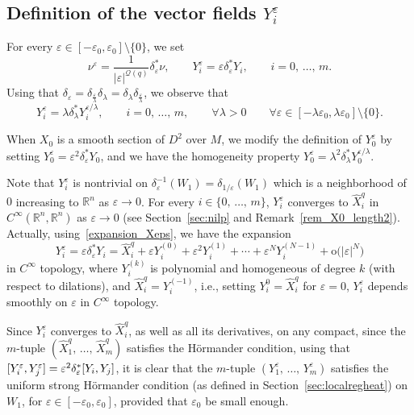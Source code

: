 \documentclass[AHL,Unicode,published]{cedram}
\newcommand*\R{\mathbb{R}}
\newcommand{\calQ}{\mathcal{Q}}
\newcommand{\rmo}{\mathrm{o}}
\let\oldforall\forall
\renewcommand*{\forall}{\mathrel{\oldforall}}
\begin{document}
\subsection{Definition of the vector fields \texorpdfstring{$Y_i^\varepsilon$}{Yi varepsilon}}
For every $\varepsilon\in[-\varepsilon_0,\varepsilon_0]\setminus\{0\}$, we set
\begin{equation}\label{defYieps}
\nu^\varepsilon = \frac{1}{\vert\varepsilon\vert^{\calQ(q)}}\delta_\varepsilon^*\nu,\qquad Y^\varepsilon_i = \varepsilon\delta_\varepsilon^*Y_i,\qquad i=0,\,\ldots,\,m.
\end{equation}
Using that $\delta_\varepsilon=\delta_{\frac{\varepsilon}{\lambda}}\delta_\lambda=\delta_\lambda\delta_{\frac{\varepsilon}{\lambda}}$, we observe that
\begin{equation}\label{homog_deltaY}
Y_i^\varepsilon = \lambda\delta_\lambda^* Y_i^{\varepsilon/\lambda},\qquad i=0,\,\ldots,\,m, \qquad \forall\lambda>0\qquad\forall\varepsilon\in[-\lambda\varepsilon_0,\lambda\varepsilon_0]\setminus\{0\}.
\end{equation}

When $X_0$ is a smooth section of $D^2$ over $M$, we modify the definition of $Y^\varepsilon_0$ by setting $Y^\varepsilon_0 = \varepsilon^2\delta_\varepsilon^*Y_0$, and we have the homogeneity property $Y_0^\varepsilon = \lambda^2\delta_\lambda^* Y_0^{\varepsilon/\lambda}$.

Note that $Y_i^\varepsilon$ is nontrivial on $\delta_\varepsilon^{-1}(W_1)=\delta_{1/\varepsilon}(W_1)$ which is a neighborhood of $0$ increasing to $\R^n$ as $\varepsilon\rightarrow 0$. For every $i\in\{0,\,\ldots,\,m\}$, $Y_i^\varepsilon$ converges to $\widehat{X}_i^{q}$ in $C^\infty(\R^n,\R^n)$ as $\varepsilon\rightarrow 0$ (see Section~\ref{sec:nilp} and Remark~\ref{rem_X0_length2}). Actually, using~\eqref{expansion_Xeps}, we have the expansion
\begin{equation}\label{expansion_Yieps}
Y_i^\varepsilon = \varepsilon \delta_\varepsilon^* Y_i = \widehat{X}_i^{q} + \varepsilon Y_i^{(0)} + \varepsilon^2 Y_i^{(1)} + \cdots + \varepsilon^N Y_i^{(N-1)} + \rmo\big(\vert\varepsilon\vert^N\big)
\end{equation}
in $C^\infty$ topology, where $Y_i^{(k)}$ is polynomial and homogeneous of degree $k$ (with respect to dilations), and $\widehat{X}_i^{q} = Y_i^{(-1)}$, i.e., setting $Y^0_i=\widehat{X}_i^{q}$ for $\varepsilon=0$, $Y^\varepsilon_i$ depends smoothly on $\varepsilon$ in $C^\infty$ topology.

Since $Y_i^\varepsilon$ converges to $\widehat{X}_i^{q}$, as well as all its derivatives, on any compact, since the $m$-tuple $(\widehat{X}_1^{q},\,\ldots,\,\widehat{X}_m^{q})$ satisfies the H\"ormander condition, using that $[Y_i^\varepsilon,Y_j^\varepsilon]\linebreak= \varepsilon^2 \delta_\varepsilon^* [Y_i,Y_j]$, it is clear that the $m$-tuple $(Y_1^\varepsilon,\,\ldots,\,Y_m^\varepsilon)$ satisfies the uniform strong H\"ormander condition (as defined in Section~\ref{sec:localregheat}) on $W_1$, for $\varepsilon\in[-\varepsilon_0,\varepsilon_0]$, provided that $\varepsilon_0$ be small enough.
\end{document}
